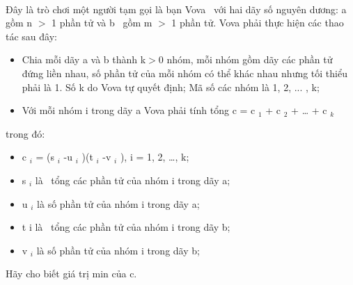  

Đây là trò chơi một người tạm gọi là bạn Vova  với hai dãy số nguyên dương: a gồm n $>$ 1 phần tử và b  gồm m $>$ 1 phần tử. Vova phải thực hiện các thao tác sau đây:
\begin{itemize}
	\item Chia mỗi dãy a và b thành k$>$0 nhóm, mỗi nhóm gồm dãy các phần tử đứng liền nhau, số phần tử của mỗi nhóm có thể khác nhau nhưng tối thiểu phải là 1. Số k do Vova tự quyết định; Mã số các nhóm là 1, 2, ... , k;
	\item Với mỗi nhóm i trong dãy a Vova phải tính tổng c = c $_ 1 $ + c $_ 2 $ + … + c $_ k $
\end{itemize}

trong đó:
\begin{itemize}
	\item c $_ i $ = (s $_ i $ -u $_ i $ )(t $_ i $ -v $_ i $ ), i = 1, 2, …, k;
	\item s $_ i $ là  tổng các phần tử của nhóm i trong dãy a;
	\item u $_ i $ là số phần tử của nhóm i trong dãy a;
	\item t i là  tổng các phần tử của nhóm i trong dãy b;
	\item v $_ i $ là số phần tử của nhóm i trong dãy b;
\end{itemize}

Hãy cho biết giá trị min của c.